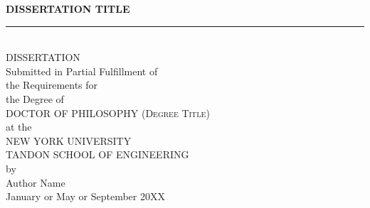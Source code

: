 \newcommand{\HRule}{\rule{8cm}{0.5mm}} 

\begin{titlepage}
\begin{center}
\enlargethispage{24pt}

\sffamily
\bfseries
\LARGE{DISSERTATION TITLE} \\
\HRule \\

\textsc{
\textrm{
\LARGE{DISSERTATION}}}\\[0.5cm]
\large{Submitted in Partial Fulfillment of \\
the Requirements for \\
the Degree of} \\[0.5cm]
\textsc{
\textrm{
\LARGE{DOCTOR OF PHILOSOPHY (Degree Title)}}} \\[0.75cm]
at the \\
\textsc{
\textrm{
\LARGE{NEW YORK UNIVERSITY \\
\setlength{\parskip}{-.25em}
TANDON SCHOOL OF ENGINEERING}}} \\
by \\[0.5cm]

\textrm{
\large{
Author Name}}\\[0.5cm]

\textrm{
\large{
January or May or September 20XX}} \\[1cm]


\end{center}

\end{titlepage}
